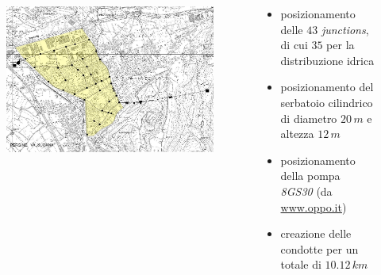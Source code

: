 \documentclass{beamer}
\begin{document}
\begin{frame}
\begin{columns}
\begin{column}{.5\textwidth}
\begin{figure}
\begin{overprint}
     \includegraphics[width=\linewidth]{images/pipes}
    \end{overprint}
   \end{figure}
  \end{column}
  
  \begin{column}{.5\textwidth}
   \begin{itemize}[<+->]
    \item posizionamento delle $43$ \emph{junctions}, di cui $35$ per la distribuzione idrica
    \item posizionamento del serbatoio cilindrico di diametro $20\,m$ e altezza $12\,m$ %
     \item posizionamento della pompa \emph{8GS30} (da \url{www.oppo.it})
     \item creazione delle condotte per un totale di $10.12\,km$
   \end{itemize}
  \end{column}
 \end{columns}
\end{frame}
%
%
%
\end{document}
